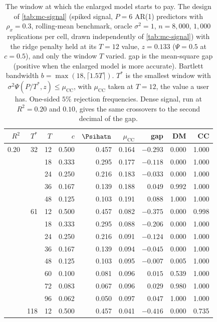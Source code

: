 \begin{table}[htbp]
\centering
\caption{The window at which the enlarged model starts to pay. The design of \cref{tab:mc-signal} (spiked signal, $P=6$ AR(1) predictors with $\rho_x=0.3$, rolling-mean benchmark, oracle $\sigma^2=1$, $n=8{,}000$, $1{,}000$ replications per cell, drawn independently of \cref{tab:mc-signal}) with the ridge penalty held at its $T=12$ value, $z=0.133$ ($\Psi=0.5$ at $c=0.5$), and only the window $T$ varied. gap is the mean-square gap (positive when the enlarged model is more accurate). Bartlett bandwidth $b=\max(18,\lceil1.5T\rceil)$. $T^*$ is the smallest window with $\sigma^2\Psi(P/T^*,z)\le\mu_{\mathrm{CC}}$, with $\mu_{\mathrm{CC}}$ taken at $T=12$, the value a user has. One-sided $5\%$ rejection frequencies. Dense signal, run at $R^2=0.20$ and $0.10$, gives the same crossovers to the second decimal of the gap.}
\label{tab:window}
\small
\setlength{\tabcolsep}{5pt}
\begin{tabular}{rrrrrrrrr}
\toprule
$R^2$ & $T^*$ & $T$ & $c$ & $\Psihatn$ & $\mu_{\mathrm{CC}}$ & gap & DM & CC \\
\midrule
0.20 & 32 & 12 & 0.500 & 0.457 & 0.164 & $-0.293$ & 0.000 & 1.000 \\
 &  & 18 & 0.333 & 0.295 & 0.177 & $-0.118$ & 0.000 & 1.000 \\
 &  & 24 & 0.250 & 0.216 & 0.183 & $-0.033$ & 0.000 & 1.000 \\
 &  & 36 & 0.167 & 0.139 & 0.188 & $0.049$ & 0.992 & 1.000 \\
 &  & 48 & 0.125 & 0.103 & 0.191 & $0.088$ & 1.000 & 1.000 \\
\addlinespace
0.10 & 61 & 12 & 0.500 & 0.457 & 0.082 & $-0.375$ & 0.000 & 0.998 \\
 &  & 18 & 0.333 & 0.295 & 0.088 & $-0.206$ & 0.000 & 1.000 \\
 &  & 24 & 0.250 & 0.216 & 0.091 & $-0.124$ & 0.000 & 1.000 \\
 &  & 36 & 0.167 & 0.139 & 0.094 & $-0.045$ & 0.000 & 1.000 \\
 &  & 48 & 0.125 & 0.103 & 0.095 & $-0.007$ & 0.005 & 1.000 \\
 &  & 60 & 0.100 & 0.081 & 0.096 & $0.015$ & 0.539 & 1.000 \\
 &  & 72 & 0.083 & 0.067 & 0.096 & $0.029$ & 0.980 & 1.000 \\
 &  & 96 & 0.062 & 0.050 & 0.097 & $0.047$ & 1.000 & 1.000 \\
\addlinespace
0.05 & 118 & 12 & 0.500 & 0.457 & 0.041 & $-0.416$ & 0.000 & 0.735 \\

\end{tabular}
\end{table}
